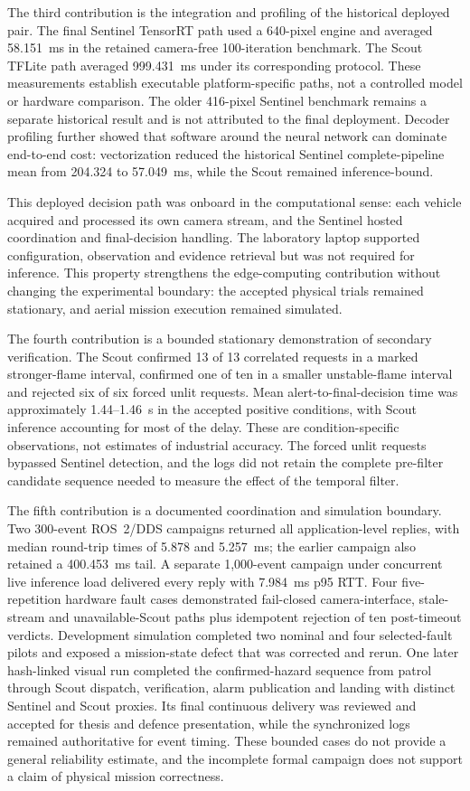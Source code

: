 The third contribution is the integration and profiling of the historical
deployed pair. The final Sentinel TensorRT path used a 640-pixel engine and
averaged 58.151~ms in the retained camera-free 100-iteration benchmark. The
Scout TFLite path averaged 999.431~ms under its corresponding protocol. These
measurements establish executable platform-specific paths, not a controlled
model or hardware comparison. The older 416-pixel Sentinel benchmark remains a
separate historical result and is not attributed to the final deployment.
Decoder profiling further showed that software around the neural network can
dominate end-to-end cost: vectorization reduced the historical Sentinel
complete-pipeline mean from 204.324 to 57.049~ms, while the Scout remained
inference-bound.

This deployed decision path was onboard in the computational sense: each
vehicle acquired and processed its own camera stream, and the Sentinel hosted
coordination and final-decision handling. The laboratory laptop supported
configuration, observation and evidence retrieval but was not required for
inference. This property strengthens the edge-computing contribution without
changing the experimental boundary: the accepted physical trials remained
stationary, and aerial mission execution remained simulated.

The fourth contribution is a bounded stationary demonstration of secondary
verification. The Scout confirmed 13 of 13 correlated requests in a marked
stronger-flame interval, confirmed one of ten in a smaller unstable-flame
interval and rejected six of six forced unlit requests. Mean
alert-to-final-decision time was approximately 1.44--1.46~s in the accepted
positive conditions, with Scout inference accounting for most of the delay.
These are condition-specific observations, not estimates of industrial
accuracy. The forced unlit requests bypassed Sentinel detection, and the logs
did not retain the complete pre-filter candidate sequence needed to measure the
effect of the temporal filter.

The fifth contribution is a documented coordination and simulation boundary.
Two 300-event ROS~2/DDS campaigns returned all application-level replies, with
median round-trip times of 5.878 and 5.257~ms; the earlier campaign also
retained a 400.453~ms tail. A separate 1,000-event campaign under concurrent
live inference load delivered every reply with 7.984~ms p95 RTT. Four
five-repetition hardware fault cases demonstrated fail-closed camera-interface,
stale-stream and unavailable-Scout paths plus idempotent rejection of ten
post-timeout verdicts. Development simulation completed two nominal and four
selected-fault pilots and exposed a mission-state defect that was corrected and
rerun. One later hash-linked visual run completed the confirmed-hazard sequence
from patrol through Scout dispatch, verification, alarm publication and landing
with distinct Sentinel and Scout proxies. Its final continuous delivery was
reviewed and accepted for thesis and defence presentation, while the synchronized
logs remained authoritative for event timing. These bounded cases do not provide
a general reliability estimate, and the incomplete formal campaign does not
support a claim of physical mission correctness.

